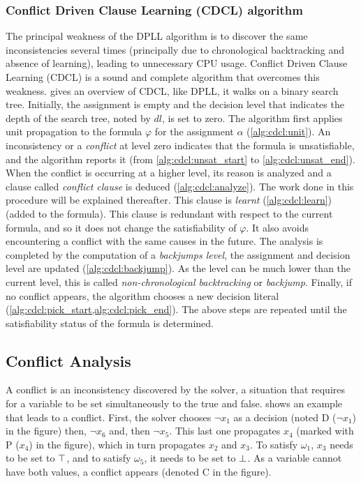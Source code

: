 \subsubsection{Conflict Driven Clause Learning (CDCL) algorithm}\label{sec:cdcl}
The principal weakness of the  DPLL algorithm is to discover the same inconsistencies several times
(principally due to chronological backtracking and absence of learning), leading to  unnecessary CPU usage.
Conflict Driven Clause Learning (CDCL) \cite{marques1999grasp} is a sound and complete algorithm
that overcomes this weakness.
 gives an overview of CDCL, like DPLL,  it walks on a binary search tree.
Initially, the  assignment is empty and the decision level that 
indicates the depth of the search tree, noted by $\mathit{dl}$, is set to zero.
The algorithm first applies unit propagation to the formula $\varphi$ for the  assignment $\alpha$ (\cref{alg:cdcl:unit}).
An inconsistency or a \emph{conflict} at level zero indicates that the formula is unsatisfiable, and the algorithm
reports it (from \cref{alg:cdcl:unsat_start} to \cref{alg:cdcl:unsat_end}). When the conflict is occurring at a higher level,
 its reason is analyzed and a clause called \emph{conflict clause} is deduced (\cref{alg:cdcl:analyze}).
The work done in this procedure will be explained thereafter.
This clause is \emph{learnt} (\cref{alg:cdcl:learn}) (added to the formula). This clause is redundant with respect 
to the current formula, and so it does not change the satisfiability of $\varphi$.
 It also avoids encountering a conflict with the same
causes in the future. %
The analysis is completed by the computation of a \emph{backjumps level}, the assignment and decision level are updated (\cref{alg:cdcl:backjump}).
 As the level can be much lower than the current level, this is called \emph{non-chronological backtracking} or \textit{backjump}.
Finally, if no conflict appears, the algorithm chooses a new decision literal 
(\cref{alg:cdcl:pick_start,alg:cdcl:pick_end}).
The above steps are repeated until the satisfiability status of the formula is determined.

\clearpage




\subsection{Conflict Analysis}
A conflict is an inconsistency discovered by the solver, a situation that requires for a variable to be set 
simultaneously to the true and false.  shows an example that leads to a conflict.
First, the solver chooses $\neg x_1$ as a decision (noted D ($\neg x_1$) in the figure) then, $\neg x_6$ and, then $\neg x_5$. This last one propagates $x_4$ (marked with P ($x_4$) in the figure),
which in turn propagates $x_2$ and $x_3$.
To satisfy $\omega_1$, $x_3$ needs to be set to $\top$, and  to satisfy $\omega_5$, 
it needs to be set to $\bot$. As a variable cannot have both values, a conflict appears (denoted C in the figure).

